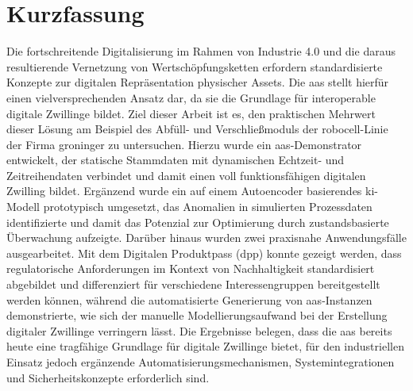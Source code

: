 \newpage
{}
{}
\section*{Kurzfassung}

Die fortschreitende Digitalisierung im Rahmen von Industrie 4.0 und die daraus resultierende Vernetzung von Wertschöpfungsketten erfordern standardisierte Konzepte zur digitalen Repräsentation physischer Assets.
Die \ac{aas} stellt hierfür einen vielversprechenden Ansatz dar, da sie die Grundlage für interoperable digitale Zwillinge bildet.
Ziel dieser Arbeit ist es, den praktischen Mehrwert dieser Lösung am Beispiel des Abfüll- und Verschließmoduls der robocell-Linie der Firma groninger zu untersuchen.
Hierzu wurde ein \acs{aas}-Demonstrator entwickelt, der statische Stammdaten mit dynamischen Echtzeit- und Zeitreihendaten verbindet und damit einen voll funktionsfähigen digitalen Zwilling bildet.
Ergänzend wurde ein auf einem Autoencoder basierendes \ac{ki}-Modell prototypisch umgesetzt, das Anomalien in simulierten Prozessdaten identifizierte und damit das Potenzial zur Optimierung durch zustandsbasierte Überwachung aufzeigte.
Darüber hinaus wurden zwei praxisnahe Anwendungsfälle ausgearbeitet. 
Mit dem Digitalen Produktpass (\acs{dpp}) konnte gezeigt werden, dass regulatorische Anforderungen im Kontext von Nachhaltigkeit standardisiert abgebildet und differenziert für verschiedene Interessengruppen bereitgestellt werden können, während die automatisierte Generierung von \ac{aas}-Instanzen demonstrierte, wie sich der manuelle Modellierungsaufwand bei der Erstellung digitaler Zwillinge verringern lässt.
Die Ergebnisse belegen, dass die \acs{aas} bereits heute eine tragfähige Grundlage für digitale Zwillinge bietet, für den industriellen Einsatz jedoch ergänzende Automatisierungsmechanismen, Systemintegrationen und Sicherheitskonzepte erforderlich sind.

